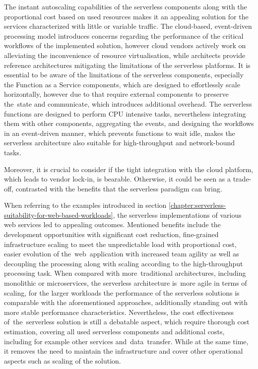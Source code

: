 The instant autoscaling capabilities of the serverless components along with the proportional cost based on used resources makes it an appealing solution for the services characterized with little or variable traffic.
The cloud-based, event-driven processing model introduces concerns regarding the performance of the critical workflows of the implemented solution, however cloud vendors actively work on alleviating the inconvenience of resource virtualisation, while architects provide reference architectures mitigating the limitations of the serverless platforms.
It is essential to be aware of the limitations of the serverless components, especially the Function as a Service components, which are designed to effortlessly scale horizontally, however due to that require external components to preserve the~state and communicate, which introduces additional overhead.
The serverless functions are designed to perform CPU intensive tasks, nevertheless integrating them with other components, aggregating the events, and designing the workflows in an event-driven manner, which prevents functions to wait idle, makes the serverless architecture also suitable for high-throughput and network-bound tasks.

Moreover, it is crucial to consider if the tight integration with the cloud platform, which leads to vendor lock-in, is bearable.
Otherwise, it could be seen as a trade-off, contrasted with the benefits that the serverless paradigm can bring.

When referring to the examples introduced in section \ref{chapter:serverless-suitability-for-web-based-workloads}, the serverless implementations of various web services led to appealing outcomes.
Mentioned benefits include the development opportunities with significant cost reduction, fine-grained infrastructure scaling to meet the unpredictable load with proportional cost, easier evolution of the~web~application with increased team agility as well as decoupling the processing along with scaling according to the high-throughput processing task.
When compared with more~traditional architectures, including monolithic or microservices, the serverless architecture is~more agile in terms of scaling, for the larger workloads the performance of the serverless solutions is comparable with the aforementioned approaches, additionally standing out with more stable performance characteristics.
Nevertheless, the cost effectiveness of~the~serverless solution is still a debatable aspect, which require thorough cost estimation, covering all used serverless components and additional costs, including for example other services and~data~transfer.
While at the same time, it removes the need to maintain the infrastructure and cover other operational aspects such as scaling of the solution.


